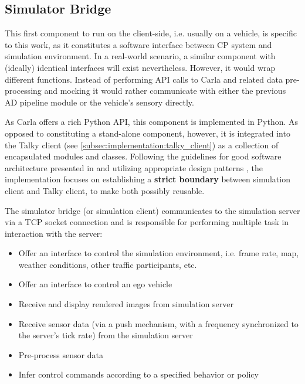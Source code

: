 \subsection{Simulator Bridge}
\label{subsec:implementation:simulator_bridge}
This first component to run on the client-side, i.e. usually on a vehicle, is specific to this work, as it constitutes a software interface between CP system and simulation environment. In a real-world scenario, a similar component with (ideally) identical interfaces will exist nevertheless. However, it would wrap different functions. Instead of performing API calls to Carla and related data pre-processing and mocking it would rather communicate with either the previous AD pipeline module or the vehicle's sensory directly. 

As Carla offers a rich Python API, this component is implemented in Python. As opposed to constituting a stand-alone component, however, it is integrated into the Talky client (see \cref{subsec:implementation:talky_client}) as a collection of encapsulated modules and classes. Following the guidelines for good software architecture presented in \cite{Martin2017} and utilizing appropriate design patterns \cite{EricFreemanElisabethFreemanBertBates2013}, the implementation focuses on establishing a \textbf{strict boundary} between simulation client and Talky client, to make both possibly reusable.

The simulator bridge (or simulation client) communicates to the simulation server via a TCP socket connection and is responsible for performing multiple task in interaction with the server:

\begin{itemize}
	\item Offer an interface to control the simulation environment, i.e. frame rate, map, weather conditions, other traffic participants, etc.
	\item Offer an interface to control an ego vehicle
	\item Receive and display rendered images from simulation server
	\item Receive sensor data (via a push mechanism, with a frequency synchronized to the server's tick rate) from the simulation server
	\item Pre-process sensor data
	\item Infer control commands according to a specified behavior or policy
\end{itemize}

